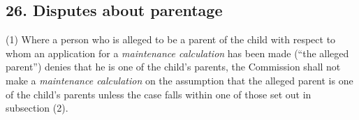\documentclass[12pt,a4paper]{article}
\begin{document}
%
%
%
%
%
%
%

\subsection{26. Disputes about parentage}

(1) Where a person who is alleged to be a parent of the child with respect to whom an application for a 
\emph{maintenance calculation}  %
has been made 
(“the alleged parent”) denies that he is one of the child’s parents, 
the 
Commission  %
shall not make a 
\emph{maintenance calculation}  %
on the assumption that the alleged parent is one of the child’s parents unless the case falls within one of those set out in subsection (2).
\end{document}
